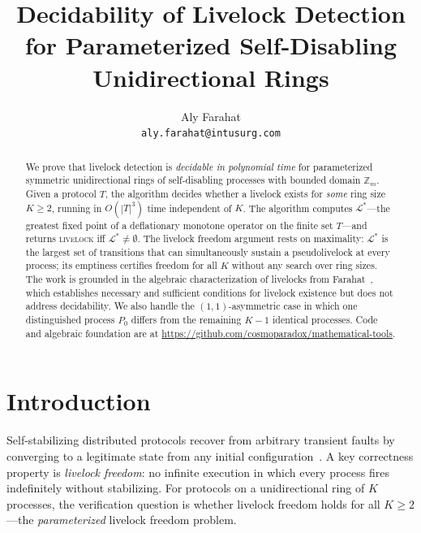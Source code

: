\documentclass{article}
\title{\textbf{Decidability of Livelock Detection\\
       for Parameterized Self-Disabling Unidirectional Rings}}
\author{
  Aly Farahat\\
  \texttt{aly.farahat@intusurg.com}
}
\newcommand{\Ls}{\mathcal{L}^{*}}
\begin{document}
\maketitle

\begin{abstract}
We prove that livelock detection is \emph{decidable in polynomial time}
for parameterized symmetric unidirectional rings of self-disabling
processes with bounded domain $\mathbb{Z}_m$.
Given a protocol $T$, the algorithm decides whether a livelock exists
for \emph{some} ring size $K\!\geq\!2$, running in $O(|T|^3)$ time
independent of $K$.
The algorithm computes $\Ls$---the greatest fixed point of a
deflationary monotone operator on the finite set $T$---and returns
\textsc{livelock} iff $\Ls\!\neq\!\emptyset$.
The livelock freedom argument rests on maximality: $\Ls$ is the
largest set of transitions that can simultaneously sustain a
pseudolivelock at every process; its emptiness certifies freedom for
all $K$ without any search over ring sizes.
The work is grounded in the algebraic characterization of livelocks
from Farahat~\citep{farahat2012}, which establishes necessary and
sufficient conditions for livelock existence but does not address
decidability. We also handle the $(1,1)$-asymmetric case in which one
distinguished process $P_0$ differs from the remaining $K\!-\!1$
identical processes.
Code and algebraic foundation are at
\url{https://github.com/cosmoparadox/mathematical-tools}.
\end{abstract}


\section{Introduction}

Self-stabilizing distributed protocols recover from arbitrary transient
faults by converging to a legitimate state from any initial
configuration~\citep{dijkstra1974}. A key correctness property is
\emph{livelock freedom}: no infinite execution in which every process
fires indefinitely without stabilizing. For protocols on a unidirectional
ring of $K$ processes, the verification question is whether livelock
freedom holds for all $K\!\geq\!2$---the \emph{parameterized} livelock
freedom problem.
\end{document}
